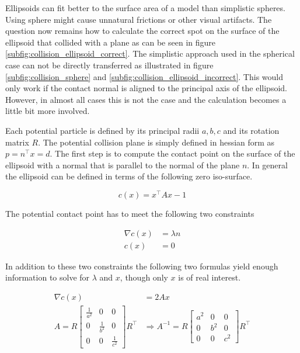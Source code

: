Ellipsoids can fit better to the surface area of a model than simplistic spheres. Using sphere might cause unnatural frictions or other visual artifacts. The question now remains how to calculate the correct spot on the surface of the ellipsoid that collided with a plane as can be seen in figure \ref{subfig:collision_ellipsoid_correct}. The simplistic approach used in the spherical case can not be directly transferred as illustrated in figure \ref{subfig:collision_sphere} and \ref{subfig:collision_ellipsoid_incorrect}. This would only work if the contact normal is aligned to the principal axis of the ellipsoid. However, in almost all cases this is not the case and the calculation becomes a little bit more involved.

Each potential particle is defined by its principal radii $a,b,c$ and its rotation matrix $R$. The potential collision plane is simply defined in hessian form as $p = n^\top x=d$. The first step is to compute the contact point on the surface of the ellipsoid with a normal that is parallel to the normal of the plane $n$. In general the ellipsoid can be defined in terms of the following zero iso-surface.

\begin{equation}
c(x) = x^\top A x - 1
\end{equation}

The potential contact point has to meet the following two constraints

\begin{align}
\nabla c(x)&=\lambda n \\
c(x) &= 0
\end{align}

In addition to these two constraints the following two formulas yield enough information to solve for $\lambda$ and $x$, though only $x$ is of real interest.

\begin{align}
\nabla c(x)&=2 A x \\
A = R \begin{bmatrix}\frac{1}{a^2} & 0 & 0 \\ 0 & \frac{1}{b^2} & 0 \\ 0 & 0 & \frac{1}{c^2}\end{bmatrix} R^\top &\Rightarrow A^{-1} = R \begin{bmatrix}a^2 & 0 & 0 \\ 0 & b^2 & 0 \\ 0 & 0 & c^2\end{bmatrix}R^\top
\end{align}


